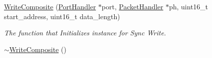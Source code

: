 \begin{DoxyCompactItemize}
\item 
\hyperlink{classmercury_1_1_write_composite_afd47717cf8c80577c676ed3dea80764e}{Write\+Composite} (\hyperlink{classmercury_1_1_port_handler}{Port\+Handler} $\ast$port, \hyperlink{classmercury_1_1_packet_handler}{Packet\+Handler} $\ast$ph, uint16\+\_\+t start\+\_\+address, uint16\+\_\+t data\+\_\+length)
\begin{DoxyCompactList}\small\item\em The function that Initializes instance for Sync Write. \end{DoxyCompactList}\item 
\hyperlink{classmercury_1_1_write_composite_a42d4018d89b57dd2df237de689c136b4}{$\sim$\+Write\+Composite} ()\hypertarget{classmercury_1_1_write_composite_a42d4018d89b57dd2df237de689c136b4}{}\label{classmercury_1_1_write_composite_a42d4018d89b57dd2df237de689c136b4}


\end{DoxyCompactItemize}
